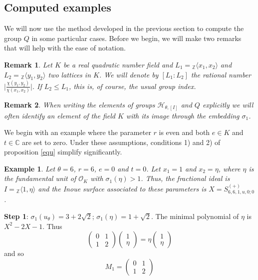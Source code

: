 \documentclass[12pt]{amsart}
\newtheorem{remark}{Remark}[section]
\newtheorem{example}{Example}[section]
\newcommand{\Z}{\mathbb{Z}}
\newcommand{\C}{\mathbb{C}}
\newcommand{\OO}{\mathcal{O}}
\begin{document}
\subsection{Computed examples}\label{expls} We will now use the method developed in the previous section to compute the group $Q$ in some particular cases. Before we begin, we will make two remarks that will help with the ease of notation.

\begin{remark}
Let $K$ be a real quadratic number field and $L_1 = {}_\Z\langle x_1, x_2\rangle$ and $L_2= {}_\Z\langle y_1,y_2\rangle$ two lattices in $K$. We will denote by $[L_1 : L_2]$ the rational number $\vert\frac{\chi(y_1,y_2)}{\chi(x_1,x_2)}\vert$. If $L_2 \leq L_1$, this is, of course, the usual group index.
\end{remark}

\begin{remark}
When writing the elements of groups $\mathcal{H}_{\theta,[I]}$ and $Q$ explicitly we will often identify an element of the field $K$ with its image through the embedding $\sigma_1$.
\end{remark}

\noindent
We begin with an example where the parameter $r$ is even and both $e \in K$ and $t \in \C$ are set to zero. Under these assumptions, conditions 1) and 2) of proposition \ref{equ} simplify significantly.

\begin{example} \label{ex1}
Let $\theta = 6$, $r = 6$, $e = 0$ and $t = 0$. Let $x_1 = 1$ and $x_2 = \eta $, where $\eta$ is the fundamental unit of $\OO_K$ with $\sigma_1(\eta)>1$. Thus, the fractional ideal is $I = {}_\Z\langle 1, \eta\rangle$ and the Inoue surface associated to these parameters is $X = S^{(+)}_{6, 6, 1, u, 0; 0}$.
\end{example}

\noindent
{\bf Step 1}: $\sigma_1(u_\theta) = 3 + 2\sqrt{2}$; $\sigma_1(\eta) = 1+\sqrt{2}$. The minimal polynomial of $\eta$ is $X^2-2X-1$. Thus 
$$
\begin{pmatrix}
0 & 1\\
1 & 2
\end{pmatrix}
\begin{pmatrix}
1 \\
\eta
\end{pmatrix}=
\eta\begin{pmatrix}
1 \\
\eta
\end{pmatrix}
$$
and so
$$
M_1=\begin{pmatrix}
0 & 1\\
1 & 2
\end{pmatrix}
$$
\end{document}
